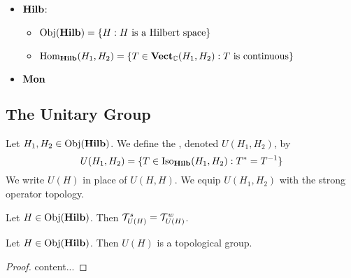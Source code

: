\documentclass{book}
\begin{document}
	\begin{itemize}
		\item $\operatorname*{\text{\textbf{Hilb}}}$:  
		\begin{itemize}
			\item $\operatorname{Obj}(\operatorname*{\text{\textbf{Hilb}}}) = \{H: H \text{ is a Hilbert space}\}$
			\item $\operatorname{Hom}_{\operatorname*{\text{\textbf{Hilb}}}}(H_1, H_2) = \{T \in \operatorname*{\text{\textbf{Vect}}}_{\mathbb{C}}(H_1, H_2): T \text{ is continuous}\}$
		\end{itemize}
		\item $\operatorname*{\text{\textbf{Mon}}}$
	\end{itemize}

	
	
	
	
	
	
	
	
	
	
	
	
	
	
	
	
	
	
	
	
	
	
	
	
	
	
	
	
	
	


	\subsection{The Unitary Group}
	
	\begin{defn}
		Let $H_1, H_2 \in \operatorname{Obj}(\operatorname*{\text{\textbf{Hilb}}})$. We define the , denoted $U(H_1, H_2)$, by 
		$$U(H_1, H_2) = \{T \in \operatorname{Iso}_{\operatorname*{\text{\textbf{Hilb}}}}(H_1, H_2): T^* = T^{-1}\}$$ 
		We write $U(H)$ in place of $U(H,H)$. We equip $U(H_1, H_2)$ with the strong operator topology. 
	\end{defn}
	
	\begin{ex}
		Let $H \in \operatorname{Obj}(\operatorname*{\text{\textbf{Hilb}}})$. Then $\mathcal{T}_{U(H)}^s = \mathcal{T}_{U(H)}^w$. 
	\end{ex}
	
	\begin{ex}
		Let $H \in \operatorname{Obj}(\operatorname*{\text{\textbf{Hilb}}})$. Then $U(H)$ is a topological group.
	\end{ex}
	
	\begin{proof}
		content...
	\end{proof}
	
\end{document}
